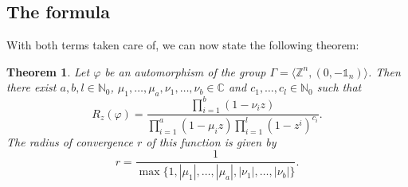 \documentclass[a4paper]{article}
\theoremstyle{plain}
\newtheorem{theorem}{Theorem}[section]
\theoremstyle{definition}
\theoremstyle{remark}
\newcommand{\I}{\mathds{1}}
\newcommand{\NN}{{\mathbb{N}}}
\newcommand{\ZZ}{{\mathbb{Z}}}
\newcommand{\CC}{{\mathbb{C}}}
\begin{document}
\subsection{The formula}
With both terms taken care of, we can now state the following theorem:
\begin{theorem}
	Let \(\varphi\) be an automorphism of the group \(\Gamma = \langle \ZZ^n, (0,-\I_n)\rangle\). Then there exist \(a,b,l \in \NN_0\), \(\mu_1, \dots, \mu_a, \nu_1, \dots, \nu_b \in \CC\) and \(c_1, \dots, c_l \in \NN_0\) such that
	\begin{equation*}
	R_z(\varphi) = \frac{ \prod_{i=1}^{b}(1-\nu_i z)}{\prod_{i=1}^{a}(1-\mu_i z) \prod_{i=1}^l (1-z^i)^{c_i}}.
	\end{equation*}
	The radius of convergence \(r\) of this function is given by 
	\begin{equation*}
	r = \frac{1}{\max\{1, |\mu_1|, \dots, |\mu_a|, |\nu_1|, \dots,|\nu_b|\}}.
	\end{equation*}
\end{theorem}
\end{document}

